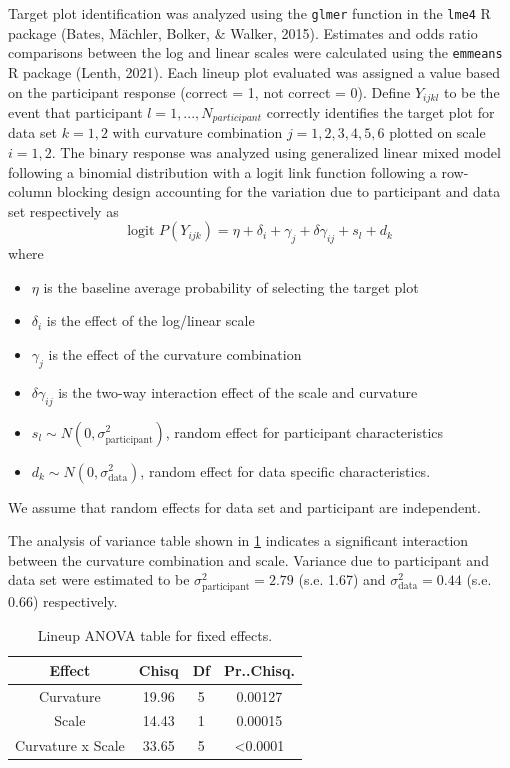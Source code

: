 \documentclass[print]{nuthesis}
\begin{document}
Target plot identification was analyzed using the \texttt{glmer} function in the \texttt{lme4} R package (Bates, Mächler, Bolker, \& Walker, 2015).
Estimates and odds ratio comparisons between the log and linear scales were calculated using the \texttt{emmeans} R package (Lenth, 2021).
Each lineup plot evaluated was assigned a value based on the participant response (correct = 1, not correct = 0).
Define \(Y_{ijkl}\) to be the event that participant \(l = 1,...,N_{participant}\) correctly identifies the target plot for data set \(k = 1,2\) with curvature combination \(j = 1,2,3,4,5,6\) plotted on scale \(i = 1,2\).
The binary response was analyzed using generalized linear mixed model following a binomial distribution with a logit link function following a row-column blocking design accounting for the variation due to participant and data set respectively as
\begin{equation}
\text{logit }P(Y_{ijk}) = \eta + \delta_i + \gamma_j + \delta \gamma_{ij} + s_l + d_k
\end{equation}
\noindent where

\begin{itemize}
\item $\eta$ is the baseline average probability of selecting the target plot
\item $\delta_i$ is the effect of the log/linear scale
\item $\gamma_j$ is the effect of the curvature combination
\item $\delta\gamma_{ij}$ is the two-way interaction effect of the scale and curvature
\item $s_l \sim N(0,\sigma^2_\text{participant})$, random effect for participant characteristics
\item $d_k \sim N(0,\sigma^2_{\text{data}})$, random effect for data specific characteristics. 
\end{itemize}

\noindent We assume that random effects for data set and participant are independent.

The analysis of variance table shown in \cref{tab:lineup-anova-table} indicates a significant interaction between the curvature combination and scale. Variance due to participant and data set were estimated to be \(\sigma^2_{\text{participant}} = 2.79\) (s.e. 1.67) and \(\sigma^2_{\text{data}} = 0.44\) (s.e. 0.66) respectively.

\begin{table}

\caption{\label{tab:lineup-anova-table}Lineup ANOVA table for fixed effects.}
\centering
\begin{tabular}[t]{cccc}
\toprule
Effect & Chisq & Df & Pr..Chisq.\\
\midrule
Curvature & 19.96 & 5 & 0.00127\\
Scale & 14.43 & 1 & 0.00015\\
Curvature x Scale & 33.65 & 5 & <0.0001\\
\bottomrule
\end{tabular}
\end{table}
\end{document}
